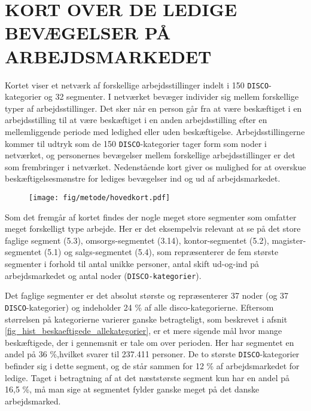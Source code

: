 


\section{KORT OVER DE LEDIGE BEVÆGELSER PÅ ARBEJDSMARKEDET \label{}}

Kortet viser et netværk af forskellige arbejdsstillinger indelt i 150 \texttt{DISCO}-kategorier og 32 segmenter. I netværket bevæger individer sig mellem forskellige typer af arbejdsstillinger. Det sker når en person går fra at være beskæftiget i en arbejdsstilling til at være beskæftiget i en anden arbejdsstilling efter en mellemliggende periode med ledighed eller uden beskæftigelse. Arbejdsstillingerne kommer til udtryk som de 150 \texttt{DISCO}-kategorier  tager form som noder i netværket, og personernes bevægelser mellem forskellige arbejdsstillinger er det som frembringer  i netværket. Nedenstående kort giver os mulighed for at overskue beskæftigelsesmønstre for lediges bevægelser ind og ud af arbejdsmarkedet.
% 
\begin{figure}[h]
\begin{centering}
	\texttt{[image: fig/metode/hovedkort.pdf]}
	\label{fig_hovedkort_disco}
\end{centering}
\end{figure}

Som det fremgår af kortet findes der nogle meget store segmenter som omfatter meget forskelligt type arbejde. Her er det eksempelvis relevant at se på det store faglige segment (5.3), omsorgs-segmentet (3.14), kontor-segmentet (5.2), magister-segmentet (5.1) og salgs-segmentet (5.4), som repræsenterer de fem største segmenter i forhold til antal unikke personer, antal skift ud-og-ind på arbejdsmarkedet og antal noder (\texttt{DISCO-kategorier}). 

Det faglige segmenter er det absolut største og repræsenterer 37 noder (og 37 \texttt{DISCO}-kategorier) og indeholder 24 \% af alle disco-kategorierne. Eftersom størrelsen på kategorierne varierer ganske betragteligt, som beskrevet i afsnit \ref{fig_hist_beskaeftigede_allekategorier}, er et mere sigende mål hvor mange beskæftigede, der i gennemsnit er tale om over perioden. Her har segmentet en andel på 36 \%,hvilket svarer til 237.411 personer. De to største \texttt{DISCO}-kategorier befinder sig i dette segment, og de står sammen for 12 \% af arbejdsmarkedet for ledige. Taget i betragtning af at det næststørste segment kun har en andel på 16,5 \%, må man sige at segmentet fylder ganske meget på det danske arbejdsmarked. 

